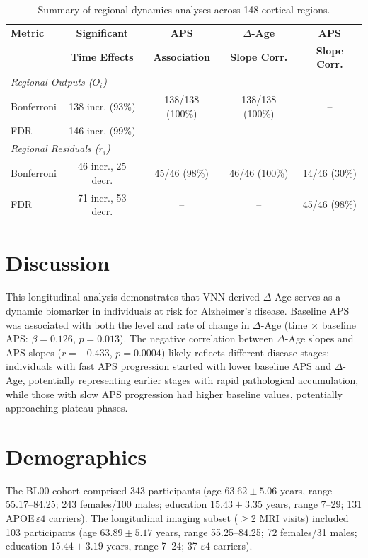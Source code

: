 \documentclass[conference]{IEEEtran}
\begin{document}
\begin{table}[!htbp]
\caption{Summary of regional dynamics analyses across 148 cortical regions.}
\label{tab:longit_regional}
\centering
\setlength{\tabcolsep}{0.5pt}
\footnotesize
\begin{tabular}{lcccc}
  \hline
  \textbf{Metric} & \textbf{Significant} & \textbf{APS} &
  \textbf{$\Delta$-Age} & \textbf{APS} \\
  & \textbf{Time Effects} & \textbf{Association} & \textbf{Slope
  Corr.} & \textbf{Slope Corr.} \\
  \hline
  \multicolumn{5}{l}{\textit{Regional Outputs ($O_i$)}} \\
  Bonferroni & 138 incr. (93\%) & 138/138 (100\%) & 138/138 (100\%) & -- \\
  FDR & 146 incr. (99\%) & -- & -- & -- \\
  \hline
  \multicolumn{5}{l}{\textit{Regional Residuals ($r_i$)}} \\
  Bonferroni & 46 incr., 25 decr. & 45/46 (98\%) & 46/46 (100\%) &
  14/46 (30\%) \\
  FDR & 71 incr., 53 decr. & -- & -- & 45/46 (98\%) \\
  \hline
\end{tabular}
\end{table}

\section{Discussion}

This longitudinal analysis demonstrates that VNN-derived $\Delta$-Age serves as a dynamic biomarker in individuals at risk for Alzheimer's disease. Baseline APS was associated with both the level and rate of change in $\Delta$-Age (time $\times$ baseline APS: $\beta = 0.126$, $p = 0.013$). The negative correlation between $\Delta$-Age slopes and APS slopes ($r = -0.433$, $p = 0.0004$) likely reflects different disease stages: individuals with fast APS progression started with lower baseline APS and $\Delta$-Age, potentially representing earlier stages with rapid pathological accumulation, while those with slow APS progression had higher baseline values, potentially approaching plateau phases.

\appendices

\section{Demographics}\label{demo}
The BL00 cohort comprised 343 participants (age $63.62 \pm 5.06$ years, range 55.17--84.25; 243 females/100 males; education $15.43 \pm 3.35$ years, range 7--29; 131 $\text{APOE}\,\varepsilon4$ carriers). The longitudinal imaging subset ($\geq$2 MRI visits) included 103 participants (age $63.89 \pm 5.17$ years, range 55.25--84.25; 72 females/31 males; education $15.44 \pm 3.19$ years, range 7--24; 37 $\varepsilon4$ carriers).
\end{document}
